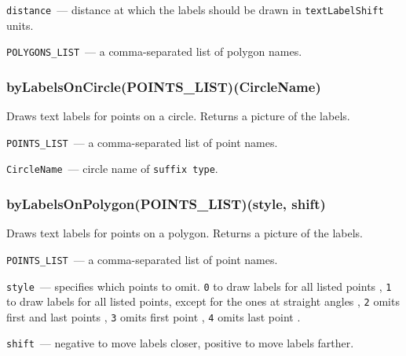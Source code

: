 	\texttt{distance}~— distance at which the labels should be drawn in \texttt{textLabelShift} units.
	
	\texttt{POLYGONS\_LIST}~— a comma-separated list of polygon names.


\subsubsection{byLabelsOnCircle(POINTS\_LIST)(CircleName)}\label{byLabelsOnCircle}
	
	Draws text labels for points on a circle. Returns a picture of the labels.
	
	\texttt{POINTS\_LIST}~— a comma-separated list of point names.
	
	\texttt{CircleName}~— circle name of \texttt{suffix type}.

\subsubsection{byLabelsOnPolygon(POINTS\_LIST)(style, shift)}\label{byLabelsOnPolygon}
	
	Draws text labels for points on a polygon. Returns a picture of the labels.
	
	
	\texttt{POINTS\_LIST}~— a comma-separated list of point names.
	
	\texttt{style}~— specifies which points to omit. \texttt{0} to draw labels for all listed points
	, \texttt{1} to draw labels for all listed points, except for the ones at straight angles
	, \texttt{2} omits first and last points
	, \texttt{3} omits first point
	, \texttt{4} omits last point
	.
	
	\texttt{shift}~— negative to move labels closer, positive to move labels farther.

